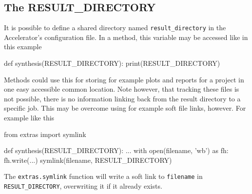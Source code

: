 \subsection{The RESULT\_DIRECTORY}
It is possible to define a shared directory
named \texttt{result\_directory} in the Accelerator's configuration
file.  In a method, this variable may be accessed like in this example
\begin{python}
def synthesis(RESULT_DIRECTORY):
    print(RESULT_DIRECTORY)
\end{python}
Methods could use this for storing for example plots and reports for a
project in one easy accessible common location.  Note however, that
tracking these files is not possible, there is no information linking
back from the result directory to a specific job.  This may be
overcome using for example soft file links, however.  For example like
this
\begin{python}
from extras import symlink

def synthesis(RESULT_DIRECTORY):
    ...
    with open(filename, 'wb') as fh:
         fh.write(...)
    symlink(filename, RESULT_DIRECTORY)
\end{python}
The \texttt{extras.symlink} function will write a soft link
to \texttt{filename} in \texttt{RESULT\_DIRECTORY}, overwriting it if
it already exists.

